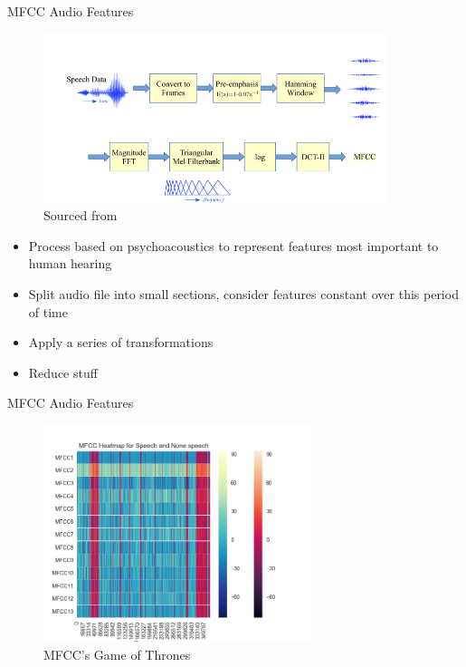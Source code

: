 \documentclass[notes]{beamer}
\begin{document}

\begin{frame}{MFCC Audio Features}
\begin{minipage}{0.45\textwidth}
	\centering
	\begin{figure}
		\includegraphics[width=0.9\textwidth]{figures/MFCC_process}
		\caption{Sourced from}
	\end{figure}
	
\end{minipage}\hfill
\begin{minipage}{0.45\textwidth}
\begin{itemize}
	\item Process based on psychoacoustics to represent features most important to human hearing
	\item Split audio file into small sections, consider features constant over this period of time
	\item Apply a series of transformations
	\item Reduce stuff
\end{itemize}
\end{minipage}\hfill
\end{frame}


\begin{frame}{MFCC Audio Features}

	\centering
	\begin{figure}
		\includegraphics[width=0.7\textwidth]{figures/mfcc_heatmap_speech_or_nospeech}
		\caption{MFCC's Game of Thrones}
	\end{figure}

\end{frame}
\end{document}
